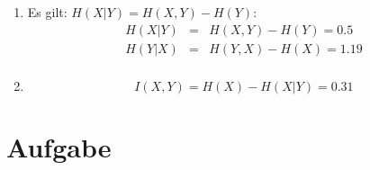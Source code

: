 \documentclass[DIN, pagenumber=false, fontsize=11pt, parskip=half]{scrartcl}
\begin{document}
\begin{enumerate}[label=(\alph*)]
        \item Es gilt: $H(X|Y) = H(X, Y) - H(Y)$:
            \begin{eqnarray*}
                H(X|Y) &=& H(X, Y) - H(Y) = 0.5 \\
                H(Y|X) &=& H(Y, X) - H(X) = 1.19 \\
            \end{eqnarray*}
        \item
            \begin{equation}
                I(X, Y) = H(X) - H(X|Y) = 0.31
            \end{equation}
    \end{enumerate}

    \section{Aufgabe}
\end{document}
